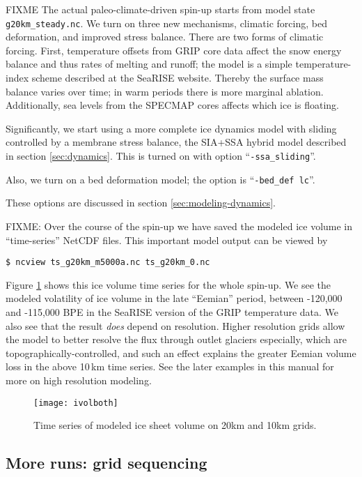 FIXME The actual paleo-climate-driven spin-up starts from model state \texttt{g20km_steady.nc}.  We turn on three new mechanisms, climatic forcing, bed deformation, and improved stress balance.  There are two forms of climatic forcing. First, temperature offsets from GRIP core data affect the snow energy balance and thus rates of melting and runoff; the model is a simple temperature-index scheme described at the SeaRISE website.  Thereby the surface mass balance varies over time; in warm periods there is more marginal ablation.  Additionally, sea levels from the SPECMAP cores affects which ice is floating.

Significantly, we start using a more complete ice dynamics model with sliding controlled by a membrane stress balance, the SIA+SSA hybrid model described in section \ref{sec:dynamics}.  This is turned on with option ``\texttt{-ssa_sliding}''.

Also, we turn on a bed deformation model; the option is ``\texttt{-bed_def lc}''.  

These options are discussed in section \ref{sec:modeling-dynamics}.

FIXME: Over the course of the spin-up we have saved the modeled ice volume in ``time-series'' NetCDF files.  This important model output can be viewed by
\begin{verbatim}
$ ncview ts_g20km_m5000a.nc ts_g20km_0.nc
\end{verbatim}
\noindent Figure \ref{fig:sr-spindone-ivolboth} shows this ice volume time series for the whole spin-up.  We see the modeled volatility of ice volume in the late ``Eemian'' period, between -120,000 and -115,000 BPE in the SeaRISE version of the GRIP temperature data.  We also see that the result \emph{does} depend on resolution.  Higher resolution grids allow the model to better resolve the flux through outlet glaciers especially, which are topographically-controlled, and such an effect explains the greater Eemian volume loss in the above 10\,km time series.  See the later examples in this manual for more on high resolution modeling.

\begin{figure}[ht]
\centering
\texttt{[image: ivolboth]}
\caption{Time series of modeled ice sheet volume on 20km and 10km grids.}
\label{fig:sr-spindone-ivolboth}
\end{figure}




\subsection{More runs: grid sequencing}  \label{subsect:gridseq}  


